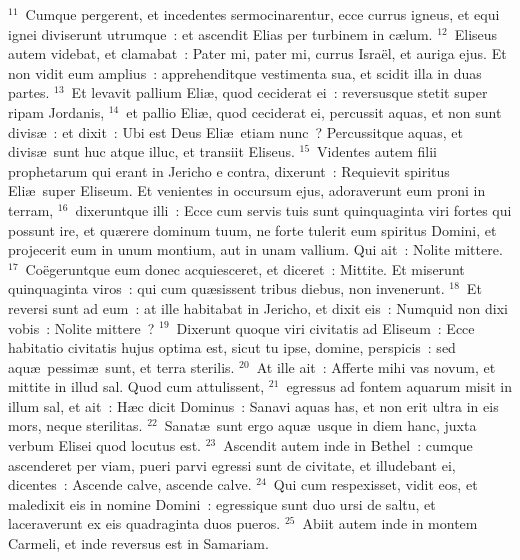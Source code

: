 ${}^{11}$~Cumque pergerent, et incedentes sermocinarentur, ecce currus igneus, et equi ignei diviserunt utrumque~: et ascendit Elias per turbinem in c\ae lum.
${}^{12}$~Eliseus autem videbat, et clamabat~: Pater mi, pater mi, currus Isra\"el, et auriga ejus. Et non vidit eum amplius~: apprehenditque vestimenta sua, et scidit illa in duas partes.
${}^{13}$~Et levavit pallium Eli\ae , quod ceciderat ei~: reversusque stetit super ripam Jordanis,
${}^{14}$~et pallio Eli\ae , quod ceciderat ei, percussit aquas, et non sunt divis\ae~: et dixit~: Ubi est Deus Eli\ae\ etiam nunc~? Percussitque aquas, et divis\ae\ sunt huc atque illuc, et transiit Eliseus.
${}^{15}$~Videntes autem filii prophetarum qui erant in Jericho e contra, dixerunt~: Requievit spiritus Eli\ae\ super Eliseum. Et venientes in occursum ejus, adoraverunt eum proni in terram,
${}^{16}$~dixeruntque illi~: Ecce cum servis tuis sunt quinquaginta viri fortes qui possunt ire, et qu\ae rere dominum tuum, ne forte tulerit eum spiritus Domini, et projecerit eum in unum montium, aut in unam vallium. Qui ait~: Nolite mittere.
${}^{17}$~Co\"egeruntque eum donec acquiesceret, et diceret~: Mittite. Et miserunt quinquaginta viros~: qui cum qu\ae sissent tribus diebus, non invenerunt.
${}^{18}$~Et reversi sunt ad eum~: at ille habitabat in Jericho, et dixit eis~: Numquid non dixi vobis~: Nolite mittere~?
${}^{19}$~Dixerunt quoque viri civitatis ad Eliseum~: Ecce habitatio civitatis hujus optima est, sicut tu ipse, domine, perspicis~: sed aqu\ae\ pessim\ae\ sunt, et terra sterilis.
${}^{20}$~At ille ait~: Afferte mihi vas novum, et mittite in illud sal. Quod cum attulissent,
${}^{21}$~egressus ad fontem aquarum misit in illum sal, et ait~: H\ae c dicit Dominus~: Sanavi aquas has, et non erit ultra in eis mors, neque sterilitas.
${}^{22}$~Sanat\ae\ sunt ergo aqu\ae\ usque in diem hanc, juxta verbum Elisei quod locutus est.
${}^{23}$~Ascendit autem inde in Bethel~: cumque ascenderet per viam, pueri parvi egressi sunt de civitate, et illudebant ei, dicentes~: Ascende calve, ascende calve.
${}^{24}$~Qui cum respexisset, vidit eos, et maledixit eis in nomine Domini~: egressique sunt duo ursi de saltu, et laceraverunt ex eis quadraginta duos pueros.
${}^{25}$~Abiit autem inde in montem Carmeli, et inde reversus est in Samariam.

